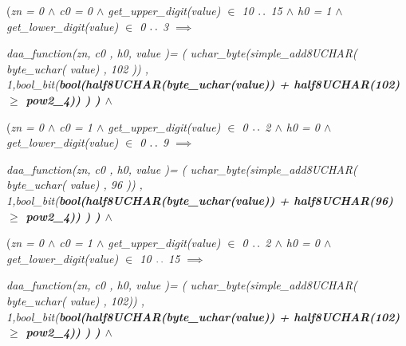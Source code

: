 \documentclass[11pt]{article}
\begin{document}
\begin{sloppypar}
\hspace*{0.60in}\rm (\hspace*{0.10in}\it zn \rm = \rm 0  $\land$  \it c0 \rm = \rm 0  $\land$  \it get\_upper\_digit\rm (\it value\rm )  $\in$  \rm 1\rm 0 $\mathbin{\ldotp\ldotp}$ \rm 1\rm 5  $\land$  \it h0 \rm = \rm 1  $\land$  \it get\_lower\_digit\rm (\it value\rm )  $\in$  \rm 0 $\mathbin{\ldotp\ldotp}$ \rm 3  $\implies$ 

\hspace*{0.80in}\it daa\_function\rm (\it zn\rm , \it c0 \rm , \it h0\hspace*{0.10in}\rm , \it value \rm )\rm = \rm ( \it uchar\_byte\rm (\it simple\_add8UCHAR\rm ( \it byte\_uchar\rm ( \it value\rm ) \rm , \rm 1\rm 0\rm 2 \rm )\rm ) \rm , \rm 1\rm ,\hspace*{0.10in}\it bool\_bit\rm (\bf bool\rm (\hspace*{0.15in}\it half8UCHAR\rm (\it byte\_uchar\rm (\it value\rm )\rm ) \rm + \it half8UCHAR\rm (\rm 1\rm 0\rm 2\rm )  $\geq$  \it pow2\_4\rm )\rm ) \rm ) \rm ) $\land$ 

\hspace*{0.60in}\rm (\hspace*{0.10in}\it zn \rm = \rm 0  $\land$  \it c0 \rm = \rm 1  $\land$  \it get\_upper\_digit\rm (\it value\rm )  $\in$  \rm 0 $\mathbin{\ldotp\ldotp}$ \rm 2  $\land$  \it h0 \rm = \rm 0  $\land$  \it get\_lower\_digit\rm (\it value\rm )  $\in$  \rm 0 $\mathbin{\ldotp\ldotp}$ \rm 9  $\implies$ 

\hspace*{0.80in}\it daa\_function\rm (\it zn\rm , \it c0 \rm , \it h0\hspace*{0.10in}\rm , \it value \rm )\rm = \rm ( \it uchar\_byte\rm (\it simple\_add8UCHAR\rm ( \it byte\_uchar\rm ( \it value\rm ) \rm , \rm 9\rm 6 \rm )\rm ) \rm , \rm 1\rm ,\hspace*{0.10in}\it bool\_bit\rm (\bf bool\rm (\hspace*{0.15in}\it half8UCHAR\rm (\it byte\_uchar\rm (\it value\rm )\rm ) \rm + \it half8UCHAR\rm (\rm 9\rm 6\rm )  $\geq$  \it pow2\_4\rm )\rm ) \rm ) \rm ) $\land$ 

\hspace*{0.60in}\rm (\hspace*{0.10in}\it zn \rm = \rm 0  $\land$  \it c0 \rm = \rm 1  $\land$  \it get\_upper\_digit\rm (\it value\rm )  $\in$  \rm 0 $\mathbin{\ldotp\ldotp}$ \rm 2  $\land$  \it h0 \rm = \rm 0  $\land$  \it get\_lower\_digit\rm (\it value\rm )  $\in$  \rm 1\rm 0 $\mathbin{\ldotp\ldotp}$ \rm 1\rm 5  $\implies$ 

\hspace*{0.80in}\it daa\_function\rm (\it zn\rm , \it c0 \rm , \it h0\hspace*{0.10in}\rm , \it value \rm )\rm = \rm ( \it uchar\_byte\rm (\it simple\_add8UCHAR\rm ( \it byte\_uchar\rm ( \it value\rm ) \rm , \rm 1\rm 0\rm 2\rm )\rm ) \rm , \rm 1\rm ,\hspace*{0.10in}\it bool\_bit\rm (\bf bool\rm (\hspace*{0.15in}\it half8UCHAR\rm (\it byte\_uchar\rm (\it value\rm )\rm ) \rm + \it half8UCHAR\rm (\rm 1\rm 0\rm 2\rm )  $\geq$  \it pow2\_4\rm )\rm ) \rm ) \rm ) $\land$ 


\end{sloppypar}
\end{document}
